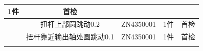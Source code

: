 \documentclass[UTF8]{ctexart}
\begin{document}
\begin{boxedminipage}{184.6mm}
\begin{tabular}{|c|c|c|c|c|}
\parbox[c][][s]{20.58mm}{\centering \smallskip 1件\smallskip}&
\parbox[c][][s]{20.58mm}{\centering \smallskip 首检\smallskip}\\
\hline
\parbox[c][][s]{9.29mm}{\centering {}\smallskip}&
\parbox[c][][s]{77.01mm}{\raggedright \smallskip 扭杆上部圆跳动0.2\smallskip}&
\parbox[c][][s]{43.15mm}{\raggedright \smallskip ZN4350001\smallskip}&
\parbox[c][][s]{20.58mm}{\centering \smallskip 1件\smallskip}&
\parbox[c][][s]{20.58mm}{\centering \smallskip 首检\smallskip}\\
\hline
\parbox[c][][s]{9.29mm}{\centering {}\smallskip}&
\parbox[c][][s]{77.01mm}{\raggedright \smallskip 扭杆靠近输出轴处圆跳动0.1\smallskip}&
\parbox[c][][s]{43.15mm}{\raggedright \smallskip ZN4350001\smallskip}&
\parbox[c][][s]{20.58mm}{\centering \smallskip 1件\smallskip}&
\parbox[c][][s]{20.58mm}{\centering \smallskip 首检\smallskip}\\
\lasthline
\end{tabular}

\end{boxedminipage}
\end{document}

